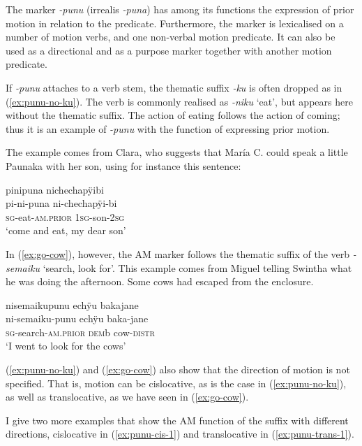 The marker \textit{-punu} (irrealis \textit{-puna}) has among its functions the expression of prior motion in relation to the predicate. Furthermore, the marker is lexicalised on a number of motion verbs, and one non-verbal motion predicate. It can also be used as a directional and as a purpose marker together with another motion predicate.

If \textit{-punu} attaches to a verb stem, the thematic suffix  \textit{-ku} is often dropped as in (\ref{ex:punu-no-ku}). The verb is commonly realised as \textit{-niku} ‘eat’, but appears here without the thematic suffix. The action of eating follows the action of coming; thus it is an example of \textit{-punu} with the function of expressing prior motion.

The example comes from Clara, who suggests that María C. could speak a little Paunaka with her son, using for instance this sentence: 

\ea\label{ex:punu-no-ku}
\begingl 
\glpreamble pinipuna nichechapÿibi\\
\gla pi-ni-puna ni-chechapÿi-bi\\ 
\textsc{sg}-eat-\textsc{am.prior} 1\textsc{sg}-son-2\textsc{sg}\\ 
\glft ‘come and eat, my dear son’\\ 
\endgl
\trailingcitation{[cux-c120414ls-2.302]}
\xe

In (\ref{ex:go-cow}), however, the AM marker follows the thematic suffix of the verb \textit{-semaiku} ‘search, look for’. This example comes from Miguel telling Swintha what he was doing the afternoon. Some cows had escaped from the enclosure.

\ea\label{ex:go-cow}
\begingl
\glpreamble nisemaikupunu echÿu bakajane\\
\gla ni-semaiku-punu echÿu baka-jane\\
\textsc{sg}-search-\textsc{am.prior} \textsc{dem}b cow-\textsc{distr}\\
\glft ‘I went to look for the cows’
\endgl
\trailingcitation{[mxx-n101017s-2.072]}
\xe{}


(\ref{ex:punu-no-ku}) and (\ref{ex:go-cow}) also show that the direction of motion is not specified. That is, motion can be cislocative, as is the case in (\ref{ex:punu-no-ku}), as well as translocative, as we have seen in (\ref{ex:go-cow}).

I give two more examples that show the AM function of the suffix with different directions, cislocative in (\ref{ex:punu-cis-1}) and translocative in (\ref{ex:punu-trans-1}).

